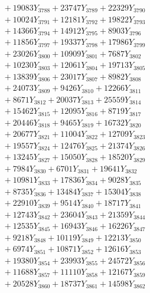 \documentclass[a4paper,10pt]{article}
\begin{document}
{\begin{align}
&\;  + 19083 Y_{3788} + 23747 Y_{3789} + 22329 Y_{3790} \\[0.3ex]
&\;  + 10024 Y_{3791} + 12181 Y_{3792} + 19822 Y_{3793} \\[0.3ex]
&\;  + 14366 Y_{3794} + 14912 Y_{3795} + 8903 Y_{3796} \\[0.3ex]
&\;  + 11856 Y_{3797} + 19337 Y_{3798} + 17986 Y_{3799} \\[0.3ex]
&\;  + 23026 Y_{3800} + 10909 Y_{3801} + 7687 Y_{3802} \\[0.3ex]
&\;  + 10230 Y_{3803} + 12061 Y_{3804} + 19713 Y_{3805} \\[0.3ex]
&\;  + 13839 Y_{3806} + 23017 Y_{3807} + 8982 Y_{3808} \\[0.5ex]\allowbreak
&\;  + 24073 Y_{3809} + 9426 Y_{3810} + 12266 Y_{3811} \\[0.3ex]
&\;  + 8671 Y_{3812} + 20037 Y_{3813} + 25559 Y_{3814} \\[0.3ex]
&\;  + 15462 Y_{3815} + 12095 Y_{3816} + 8719 Y_{3817} \\[0.3ex]
&\;  + 20446 Y_{3818} + 9465 Y_{3819} + 16732 Y_{3820} \\[0.3ex]
&\;  + 20677 Y_{3821} + 11004 Y_{3822} + 12709 Y_{3823} \\[0.3ex]
&\;  + 19557 Y_{3824} + 12476 Y_{3825} + 21374 Y_{3826} \\[0.3ex]
&\;  + 13245 Y_{3827} + 15050 Y_{3828} + 18520 Y_{3829} \\[0.3ex]
&\;  + 7984 Y_{3830} + 6701 Y_{3831} + 19641 Y_{3832} \\[0.3ex]
&\;  + 10981 Y_{3833} + 17836 Y_{3834} + 9028 Y_{3835} \\[0.3ex]
&\;  + 8735 Y_{3836} + 13484 Y_{3837} + 15304 Y_{3838} \\[0.5ex]\allowbreak
&\;  + 22910 Y_{3839} + 9514 Y_{3840} + 18717 Y_{3841} \\[0.3ex]
&\;  + 12743 Y_{3842} + 23604 Y_{3843} + 21359 Y_{3844} \\[0.3ex]
&\;  + 12535 Y_{3845} + 16943 Y_{3846} + 16226 Y_{3847} \\[0.3ex]
&\;  + 9218 Y_{3848} + 10119 Y_{3849} + 12213 Y_{3850} \\[0.3ex]
&\;  + 6974 Y_{3851} + 10871 Y_{3852} + 12616 Y_{3853} \\[0.3ex]
&\;  + 19380 Y_{3854} + 23993 Y_{3855} + 24572 Y_{3856} \\[0.3ex]
&\;  + 11688 Y_{3857} + 11110 Y_{3858} + 12167 Y_{3859} \\[0.3ex]
&\;  + 20528 Y_{3860} + 18737 Y_{3861} + 14598 Y_{3862} \\[0.3ex]

\end{align}}
\end{document}
